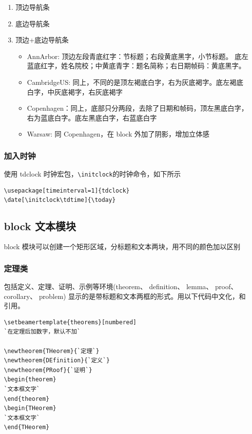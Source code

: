 \begin{description}
\begin{enumerate}
  \item 顶边导航条
  \item 底边导航条
  \item 顶边+底边导航条
  \begin{itemize}
    \item AnnArbor: 顶边左段青底红字：节标题；右段黄底黑字，小节标题。
    底左蓝底红字，姓名院校；中黄底青字：题名简称；右日期帧码：黄底黑字。
    \item CambridgeUS: 同上，不同的是顶左褐底白字，右为灰底褐字。底左褐底白字，中灰底褐字，右灰底褐字
    \item Copenhagen：同上，底部只分两段，去除了日期和帧码，顶左黑底白字，右为蓝底白字。底左黑底白字，右蓝底白字
    \item Warsaw: 同 Copenhagen，在 block 外加了阴影，增加立体感
  \end{itemize}
\end{enumerate}

\end{description}


\subsubsection{加入时钟}


使用 tdclock 时钟宏包，\verb$\initclock$的时钟命令，如下所示
\begin{lstlisting}[language={[LaTeX]TeX}]
\usepackage[timeinterval=1]{tdclock}
\date[\initclock\tdtime]{\today}
\end{lstlisting}

\subsection{block 文本模块}
block 模块可以创建一个矩形区域，分标题和文本两块，用不同的颜色加以区别
\subsubsection{定理类}

包括定义、定理、证明、示例等环境(theorem、 definition、 lemma、 proof、 corollary、 problem)
显示的是带标题和文本两框的形式。用以下代码中文化，和引用。
\begin{lstlisting}[language={[LaTeX]TeX}]
\setbeamertemplate{theorems}[numbered]
`在定理后加数字，默认不加`

\newtheorem{THeorem}{`定理`}
\newtheorem{DEfinition}{`定义`}
\newtheorem{PRoof}{`证明`}
\begin{theorem}
`文本框文字`
\end{theorem}
\begin{THeorem}
`文本框文字`
\end{THeorem}

\end{lstlisting}

